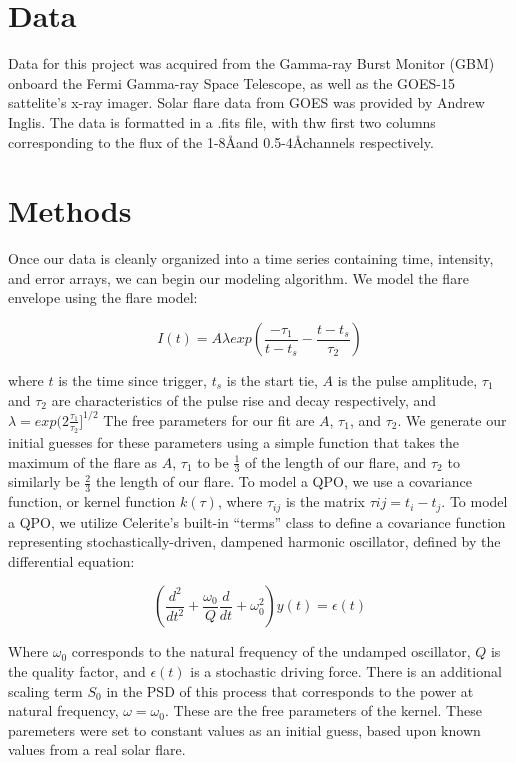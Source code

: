 \documentclass{aastex61}
\begin{document}
\section{Data} \label{sec:data}
Data for this project was acquired from the Gamma-ray Burst Monitor (GBM) onboard the Fermi Gamma-ray Space Telescope, as well as the GOES-15 sattelite's x-ray imager.
Solar flare data from GOES  was provided by Andrew Inglis.
The data is formatted in a .fits file, with thw first two columns corresponding to the flux of the 1-8\AA and 0.5-4\AA channels respectively.



\section{Methods} \label{sec:methods}
Once our data is cleanly organized into a time series containing time, intensity, and error arrays, we can begin our modeling algorithm. We model the flare envelope using the flare model:

\begin{equation}
	I(t) = A \lambda exp{\left( \frac{-\tau_1}{t-t_s}-\frac{t-t_s}{\tau_2}\right)}
	\label{model}
\end{equation}

where $t$ is the time since trigger, $t_s$ is the start tie, $A$ is the pulse amplitude, $\tau_1$ and $\tau_2$ are characteristics of the pulse rise and decay respectively, and 
$\lambda = exp(2\frac{\tau_1}{\tau_2}]^{1/2}$
The free parameters for our fit are $A$, $\tau_1$, and $\tau_2$.
We generate our initial guesses for these parameters using a simple function that takes the maximum of the flare as $A$, $\tau_1$ to be $\frac{1}{3}$ of the length of our flare, and $\tau_2$ to similarly be $\frac{2}{3}$ the length of our flare.
To model a QPO, we use a covariance function, or kernel function $k(\tau)$, where $\tau_{ij}$ is the matrix $\tau{ij} = t_i-t_j$. To model a QPO, we utilize Celerite's built-in ``terms'' class to define a covariance function representing stochastically-driven, dampened harmonic oscillator, defined by the differential equation:

\begin{equation}
	\left( \frac{d^2}{dt^2} + \frac{\omega_0}{Q} \frac{d}{dt} + \omega_0^2 \right) y(t) = \epsilon(t) 
	\label{sho}
\end{equation}

Where $\omega_0$ corresponds to the natural frequency of the undamped oscillator, $Q$ is the quality factor, and $\epsilon(t)$ is a stochastic driving force.
There is an additional scaling term $S_0$ in the PSD of this process that corresponds to the power at natural frequency, $\omega=\omega_0$. These are the free parameters of the kernel.
These paremeters were set to constant values as an initial guess, based upon known values from a real solar flare.
\end{document}

